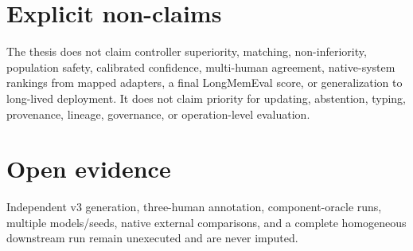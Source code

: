 \section{Explicit non-claims}\label{explicit-non-claims}

The thesis does not claim controller superiority, matching,
non-inferiority, population safety, calibrated confidence, multi-human
agreement, native-system rankings from mapped adapters, a final
LongMemEval score, or generalization to long-lived deployment. It does
not claim priority for updating, abstention, typing, provenance,
lineage, governance, or operation-level evaluation.

\section{Open evidence}\label{open-evidence}

Independent v3 generation, three-human annotation, component-oracle
runs, multiple models/seeds, native external comparisons, and a complete
homogeneous downstream run remain unexecuted and are never imputed.
